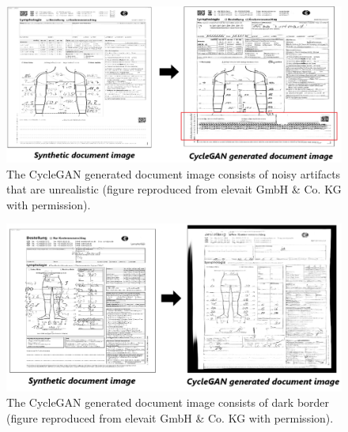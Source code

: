 \begin{figure}[H]
        \begin{center}
	    \includegraphics[scale=0.50]{images/Evaluation/failure2.png}
	    \caption[The \ac{CycleGAN} generated document image consists of noisy artifacts that are unrealistic.]{The \ac{CycleGAN} generated document image consists of noisy artifacts that are unrealistic (figure reproduced from elevait GmbH \& Co. KG with permission).}
	    \label{fig:failure2}
	    \end{center}
\end{figure}

\begin{figure}[H]
        \begin{center}
	    \includegraphics[scale=0.50]{images/Evaluation/failure3.png}
	    \caption[The \ac{CycleGAN} generated document image consists of dark border.]{The \ac{CycleGAN} generated document image consists of dark border (figure reproduced from elevait GmbH \& Co. KG with permission).}
	    \label{fig:failure3}
	    \end{center}
\end{figure}


